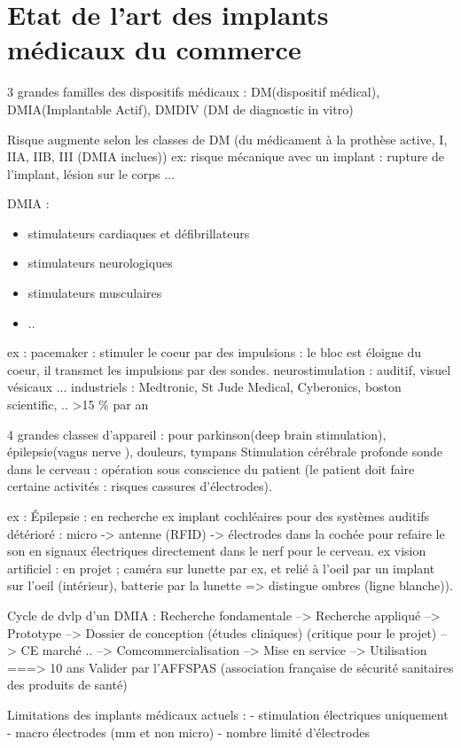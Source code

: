 \documentclass[a4paper,12pt]{article}
\begin{document}
\section{Etat de l'art des implants médicaux du commerce}
3 grandes familles des dispositifs médicaux : DM(dispositif médical), DMIA(Implantable Actif), DMDIV (DM de diagnostic in vitro)

Risque augmente selon les classes de DM (du médicament à la prothèse active, I, IIA, IIB, III (DMIA inclues))
ex: risque mécanique avec un implant : rupture de l'implant, lésion sur le corps ...

DMIA : 
\begin{itemize}
\item stimulateurs cardiaques et défibrillateurs
\item stimulateurs neurologiques
\item stimulateurs musculaires
\item ..
\end{itemize}
ex : pacemaker : stimuler le coeur par des impulsions : le bloc est éloigne du coeur, il transmet les impulsions par des sondes.
neurostimulation : auditif, visuel vésicaux ...
industriels : Medtronic, St Jude Medical, Cyberonics, boston scientific, ..
>15 \% par an

4 grandes classes d'appareil : pour parkinson(deep brain stimulation), épilepsie(vagus nerve ), douleurs, tympans
Stimulation cérébrale profonde sonde dans le cerveau : opération sous conscience du patient (le patient doit faire certaine activités : risques cassures d'électrodes).


ex : Épilepsie : en recherche
ex implant cochléaires pour des systèmes auditifs détérioré : micro -> antenne (RFID) -> électrodes dans la cochée pour refaire le son en signaux électriques directement dans le nerf pour le cerveau. 
ex vision artificiel : en projet ; caméra sur lunette par ex, et relié à l'oeil par un implant sur l'oeil (intérieur), batterie par la lunette => distingue ombres (ligne blanche)).

Cycle de dvlp d'un DMIA : Recherche fondamentale --> Recherche appliqué --> Prototype --> Dossier de conception (études cliniques) (critique pour le projet) --> CE marché .. --> Comcommercialisation --> Mise en service --> Utilisation  ===> 10 ans
Valider par l'AFFSPAS (association française de sécurité sanitaires des produits de santé)

Limitations des implants médicaux actuels :
- stimulation électriques uniquement
- macro électrodes (mm et non micro)
- nombre limité d'électrodes
\end{document}
